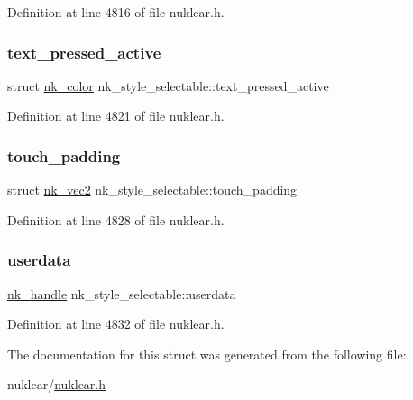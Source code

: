 Definition at line 4816 of file nuklear.\+h.

\mbox{\label{structnk__style__selectable_aecb0b9ee1fb0cdd7d2d42f254c344cd6}} 
\subsubsection{\texorpdfstring{text\+\_\+pressed\+\_\+active}{text\_pressed\_active}}
{\footnotesize\ttfamily struct \mbox{\hyperlink{structnk__color}{nk\+\_\+color}} nk\+\_\+style\+\_\+selectable\+::text\+\_\+pressed\+\_\+active}



Definition at line 4821 of file nuklear.\+h.

\mbox{\label{structnk__style__selectable_a7c609f101e3d34ab2efd47512261285e}} 
\subsubsection{\texorpdfstring{touch\+\_\+padding}{touch\_padding}}
{\footnotesize\ttfamily struct \mbox{\hyperlink{structnk__vec2}{nk\+\_\+vec2}} nk\+\_\+style\+\_\+selectable\+::touch\+\_\+padding}



Definition at line 4828 of file nuklear.\+h.

\mbox{\label{structnk__style__selectable_ab0cdeefe700feb442aefb82a49aa930b}} 
\subsubsection{\texorpdfstring{userdata}{userdata}}
{\footnotesize\ttfamily \mbox{\hyperlink{unionnk__handle}{nk\+\_\+handle}} nk\+\_\+style\+\_\+selectable\+::userdata}



Definition at line 4832 of file nuklear.\+h.



The documentation for this struct was generated from the following file\+:\begin{DoxyCompactItemize}
\item 
nuklear/\mbox{\hyperlink{nuklear_8h}{nuklear.\+h}}\end{DoxyCompactItemize}

